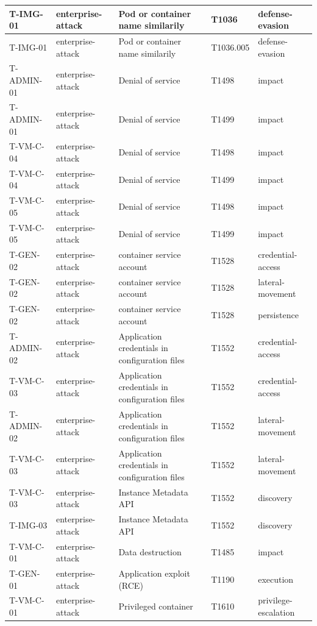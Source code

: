 \begin{longtable}{|l|l|l|l|l|}
    T-IMG-01 & enterprise-attack & Pod or container name similarily & T1036 & defense-evasion \\ \hline
    T-IMG-01 & enterprise-attack & Pod or container name similarily & T1036.005 & defense-evasion \\ \hline
    T-ADMIN-01 & enterprise-attack & Denial of service & T1498 & impact \\ \hline
    T-ADMIN-01 & enterprise-attack & Denial of service & T1499 & impact \\ \hline
    T-VM-C-04 & enterprise-attack & Denial of service & T1498 & impact \\ \hline
    T-VM-C-04 & enterprise-attack & Denial of service & T1499 & impact \\ \hline
    T-VM-C-05 & enterprise-attack & Denial of service & T1498 & impact \\ \hline
    T-VM-C-05 & enterprise-attack & Denial of service & T1499 & impact \\ \hline
    T-GEN-02 & enterprise-attack & container service account & T1528 & credential-access \\ \hline
    T-GEN-02 & enterprise-attack & container service account & T1528 & lateral-movement \\ \hline
    T-GEN-02 & enterprise-attack & container service account & T1528 & persistence \\ \hline
    T-ADMIN-02 & enterprise-attack & Application credentials in configuration files & T1552 & credential-access \\ \hline
    T-VM-C-03 & enterprise-attack & Application credentials in configuration files & T1552 & credential-access \\ \hline
    T-ADMIN-02 & enterprise-attack & Application credentials in configuration files & T1552 & lateral-movement \\ \hline
    T-VM-C-03 & enterprise-attack & Application credentials in configuration files & T1552 & lateral-movement \\ \hline
    T-VM-C-03 & enterprise-attack & Instance Metadata API & T1552 & discovery \\ \hline
    T-IMG-03 & enterprise-attack & Instance Metadata API & T1552 & discovery \\ \hline
    T-VM-C-01 & enterprise-attack & Data destruction & T1485 & impact \\ \hline
    T-GEN-01 & enterprise-attack & Application exploit (RCE) & T1190 & execution \\ \hline
    T-VM-C-01 & enterprise-attack & Privileged container & T1610 & privilege-escalation \\ \hline

\end{longtable}

